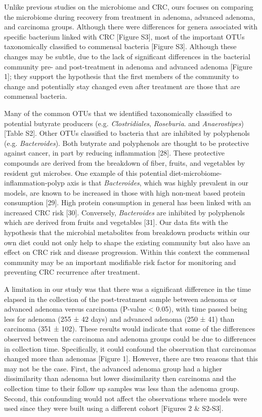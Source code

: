 \documentclass[12pt,]{article}
\begin{document}
Unlike previous studies on the microbiome and CRC, ours focuses on
comparing the microbiome during recovery from treatment in adenoma,
advanced adenoma, and carcinoma groups. Although there were differences
for genera associated with specific bacterium linked with CRC {[}Figure
S3{]}, most of the important OTUs taxonomically classified to commensal
bacteria {[}Figure S3{]}. Although these changes may be subtle, due to
the lack of significant differences in the bacterial community pre- and
post-treatment in adenoma and advanced adenoma {[}Figure 1{]}; they
support the hypothesis that the first members of the community to change
and potentially stay changed even after treatment are those that are
commensal bacteria.

Many of the common OTUs that we identified taxonomically classified to
potential butyrate producers (e.g. \emph{Clostridiales},
\emph{Roseburia}. and \emph{Anaerostipes}) {[}Table S2{]}. Other OTUs
classified to bacteria that are inhibited by polyphenols (e.g.
\emph{Bacteroides}). Both butyrate and polyphenols are thought to be
protective against cancer, in part by reducing inflammation {[}28{]}.
These protective compounds are derived from the breakdown of fiber,
fruits, and vegetables by resident gut microbes. One example of this
potential diet-microbiome-inflammation-polyp axis is that
\emph{Bacteroides}, which was highly prevalent in our models, are known
to be increased in those with high non-meat based protein consumption
{[}29{]}. High protein consumption in general has been linked with an
increased CRC risk {[}30{]}. Conversely, \emph{Bacteroides} are
inhibited by polyphenols which are derived from fruits and vegetables
{[}31{]}. Our data fits with the hypothesis that the microbial
metabolites from breakdown products within our own diet could not only
help to shape the existing community but also have an effect on CRC risk
and disease progression. Within this context the commensal community may
be an important modifiable risk factor for monitoring and preventing CRC
recurrence after treatment.

A limitation in our study was that there was a significant difference in
the time elapsed in the collection of the post-treatment sample between
adenoma or advanced adenoma versus carcinoma (P-value \textless{} 0.05),
with time passed being less for adenoma (255 ± 42 days) and advanced
adenoma (250 ± 41) than carcinoma (351 ± 102). These results would
indicate that some of the differences observed between the carcinoma and
adenoma groups could be due to differences in collection time.
Specifically, it could confound the observation that carcinomas changed
more than adenomas {[}Figure 1{]}. However, there are two reasons that
this may not be the case. First, the advanced adenoma group had a higher
dissimilarity than adenoma but lower dissimilarity then carcinoma and
the collection time to their follow up samples was less than the adenoma
group. Second, this confounding would not affect the observations where
models were used since they were built using a different cohort
{[}Figures 2 \& S2-S3{]}.
\end{document}

